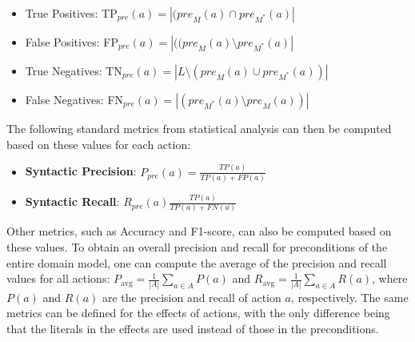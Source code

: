 \documentclass[letterpaper]{article} %
\newcommand{\pre}{\ensuremath{\textit{pre}}\xspace}
\newcommand{\eff}{\ensuremath{\textit{eff}}\xspace}
\newcommand{\realm}{{\ensuremath{M^*}}\xspace}
\newif\ifaddcomments
\newcommand{\roni}[1]{\ifaddcomments{\textcolor{red}{[Roni: #1]}}\fi}
\begin{document}
 \begin{itemize}
    \item True Positives: TP$_\pre(a)=|(\pre_M(a)\cap \pre_\realm(a)|$
    \item False Positives: FP$_\pre(a)=|((\pre_M(a)\setminus \pre_\realm(a)|$
    \item True Negatives: TN$_\pre(a)=|L \setminus(\pre_M(a)\cup \pre_\realm(a))|$
    \item False Negatives: FN$_\pre(a)=|(\pre_\realm(a)\setminus \pre_M(a))|$
\end{itemize}
The following standard metrics from statistical analysis can then be computed based on these values for each action:
\begin{itemize}
    \item \textbf{Syntactic Precision}: $P_\pre(a)=\frac{TP(a)}{TP(a)+FP(a)}$
    \item \textbf{Syntactic Recall}: $R_\pre(a)\frac{TP(a)}{TP(a)+FN(a)}$
\end{itemize}
Other metrics, such as Accuracy and F1-score, can also be computed based on these values. 
To obtain an overall precision and recall for preconditions of the entire domain model, one can compute the average of the precision and recall values for all actions:
$P_\text{avg}=\frac{1}{|A|}\sum_{a\in A} P(a)$ and $R_\text{avg}=\frac{1}{|A|}\sum_{a\in A} R(a)$, where $P(a)$ and $R(a)$ are the precision and recall of action $a$, respectively. 
The same metrics can be defined for the effects of actions, with the only difference being that the literals in the effects are used instead of those in the preconditions. 
\end{document}
